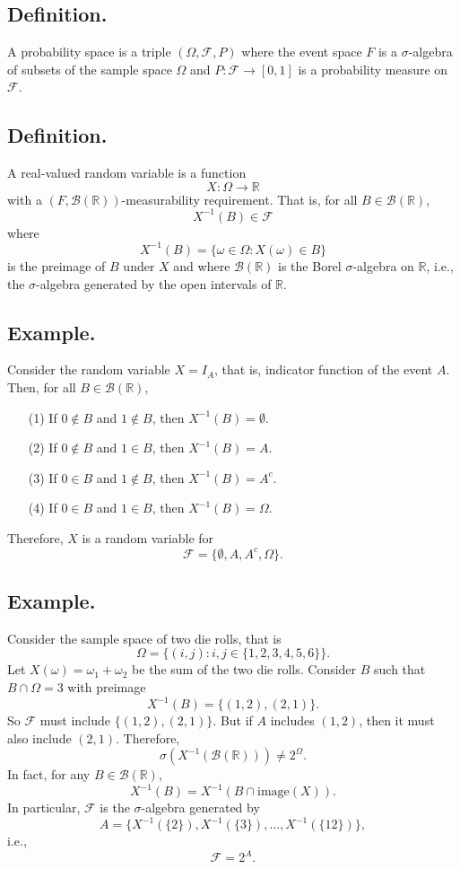 \documentclass[titlepage]{article}
\begin{document}
\subsection{Definition.} A probability space is a triple $(\Omega, \mathcal{F}, P)$ where the event space $F$ is a $\sigma$-algebra of subsets of the sample space $\Omega$ and $P: \mathcal{F} \to [0, 1]$ is a probability measure on $\mathcal{F}$.

\subsection{Definition.} A real-valued random variable is a function 
$$X: \Omega \to \mathbb{R}$$
with a $(F, \mathcal{B}(\mathbb{R}))$-measurability requirement. That is, for all $B \in \mathcal{B}(\mathbb{R})$, 
$$X^{-1}(B) \in \mathcal{F}$$
where 
$$X^{-1}(B) = \{\omega \in \Omega: X(\omega) \in B\}$$
is the preimage of $B$ under $X$ and where $\mathcal{B}(\mathbb{R})$ is the Borel $\sigma$-algebra on $\mathbb{R}$, i.e., the $\sigma$-algebra generated by the open intervals of $\mathbb{R}$.

\subsection{Example.} Consider the random variable $X = I_{A}$, that is, indicator function of the event $A$. Then, for all $B \in \mathcal{B}(\mathbb{R})$, 
\begin{enumerate}
\item[(1)] If $0 \not\in B$ and $1 \not\in B$, then $X^{-1}(B) = \emptyset$.
\item[(2)] If $0 \not\in B$ and $1 \in B$, then $X^{-1}(B) = A$.
\item[(3)] If $0 \in B$ and $1 \not\in B$, then $X^{-1}(B) = A^{c}$.
\item[(4)] If $0 \in B$ and $1 \in B$, then $X^{-1}(B) = \Omega$.
\end{enumerate}
Therefore, $X$ is a random variable for 
$$\mathcal{F} = \{\emptyset, A, A^{c}, \Omega\}.$$

\subsection{Example.} Consider the sample space of two die rolls, that is 
$$\Omega = \{(i, j): i, j \in \{1, 2, 3, 4, 5, 6\}\}.$$
Let $X(\omega) = \omega_{1} + \omega_{2}$ be the sum of the two die rolls. Consider $B$ such that $B \cap \Omega = 3$ with preimage 
$$X^{-1}(B) = \{(1, 2), (2, 1)\}.$$
So $\mathcal{F}$ must include $\{(1, 2), (2, 1)\}$. But if $A$ includes $(1, 2)$, then it must also include $(2, 1)$. Therefore, 
$$\sigma(X^{-1}(\mathcal{B}(\mathbb{R}))) \neq 2^{\Omega}.$$
In fact, for any $B \in \mathcal{B}(\mathbb{R})$,
$$X^{-1}(B) = X^{-1}(B \cap \text{image}(X)) .$$
In particular, $\mathcal{F}$ is the $\sigma$-algebra generated by 
$$A = \{X^{-1}(\{2\}), X^{-1}(\{3\}), \ldots, X^{-1}(\{12\})\},$$
i.e., 
$$\mathcal{F} = 2^{A}.$$
\end{document}
